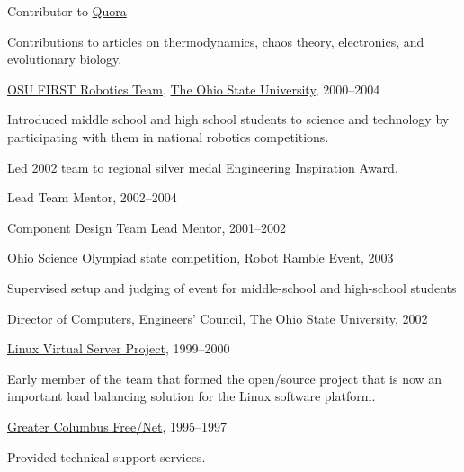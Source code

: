 \documentclass[10pt]{article}
\renewcommand\emph[1]{#1}
\newcommand{\halfblankline}{\quad\vspace{-0.5\baselineskip}\pagebreak[3]}
\begin{document}
\halfblankline

Contributor to \href{http://www.quora.com/}{Quora}
%
\begin{innerlist}
    \item Contributions to articles on thermodynamics, chaos theory,
        electronics, and evolutionary biology.
\end{innerlist}

\halfblankline

\href{http://www.osufirst.org/}{OSU FIRST Robotics Team},
\href{http://www.osu.edu}{The Ohio State University}, 2000--2004
\begin{innerlist}
\item Introduced middle school and high school students to science and
        technology by participating with them in national robotics
        competitions.
\item Led 2002 team to regional silver medal
        \href{http://www.firstwiki.org/Engineering_Inspiration_Award}
             {\emph{Engineering Inspiration Award}}.
\item \emph{Lead Team Mentor}, 2002--2004
\item \emph{Component Design Team Lead Mentor}, 2001--2002
\end{innerlist}

\halfblankline

Ohio Science Olympiad state competition, Robot Ramble Event, 2003
%
\begin{innerlist}
    \item Supervised setup and judging of event for middle-school and
        high-school students
\end{innerlist}

\halfblankline

Director of Computers,
\href{http://ec.osu.edu/}{Engineers' Council},
\href{http://www.osu.edu/}{The Ohio State University}, 2002

\halfblankline

\href{http://www.linuxvirtualserver.org/}
     {Linux Virtual Server Project}, 1999--2000
\begin{innerlist}
\item Early member of the team that formed the open\-/source project that
        is now an important load balancing solution for the Linux
        software platform.
\end{innerlist}

\halfblankline

\href{http://www.gcfn.org/}
     {Greater Columbus Free\-/Net}, 1995--1997
\begin{innerlist}
\item Provided technical support services.
\end{innerlist}
\end{document}

